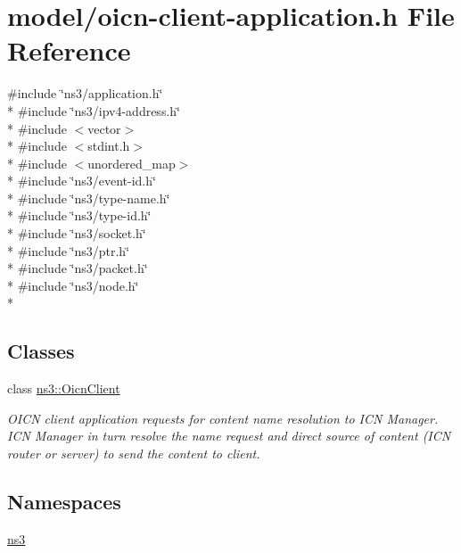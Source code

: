 \hypertarget{oicn-client-application_8h}{\section{model/oicn-\/client-\/application.h File Reference}
\label{oicn-client-application_8h}
}
{\ttfamily \#include \char`\"{}ns3/application.\-h\char`\"{}}\\*
{\ttfamily \#include \char`\"{}ns3/ipv4-\/address.\-h\char`\"{}}\\*
{\ttfamily \#include $<$vector$>$}\\*
{\ttfamily \#include $<$stdint.\-h$>$}\\*
{\ttfamily \#include $<$unordered\-\_\-map$>$}\\*
{\ttfamily \#include \char`\"{}ns3/event-\/id.\-h\char`\"{}}\\*
{\ttfamily \#include \char`\"{}ns3/type-\/name.\-h\char`\"{}}\\*
{\ttfamily \#include \char`\"{}ns3/type-\/id.\-h\char`\"{}}\\*
{\ttfamily \#include \char`\"{}ns3/socket.\-h\char`\"{}}\\*
{\ttfamily \#include \char`\"{}ns3/ptr.\-h\char`\"{}}\\*
{\ttfamily \#include \char`\"{}ns3/packet.\-h\char`\"{}}\\*
{\ttfamily \#include \char`\"{}ns3/node.\-h\char`\"{}}\\*
\subsection*{Classes}
\begin{DoxyCompactItemize}
\item 
class \hyperlink{classns3_1_1OicnClient}{ns3\-::\-Oicn\-Client}
\begin{DoxyCompactList}\small\item\em O\-I\-C\-N client application requests for content name resolution to I\-C\-N Manager. I\-C\-N Manager in turn resolve the name request and direct source of content (I\-C\-N router or server) to send the content to client. \end{DoxyCompactList}\end{DoxyCompactItemize}
\subsection*{Namespaces}
\begin{DoxyCompactItemize}
\item 
\hyperlink{namespacens3}{ns3}
\end{DoxyCompactItemize}
